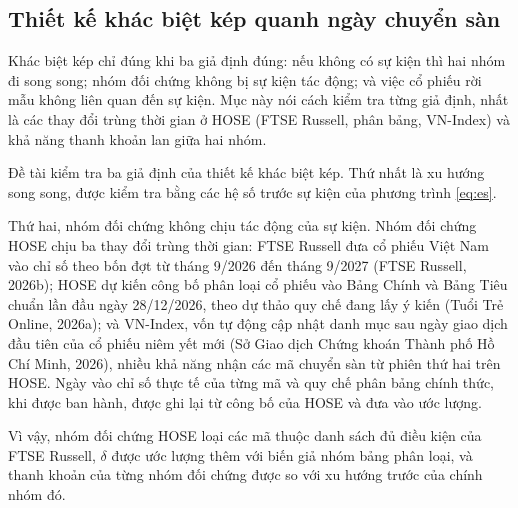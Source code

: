 \subsection{Thiết kế khác biệt kép quanh ngày chuyển sàn}\label{sec:did}

\begin{tomtat}
Khác biệt kép chỉ đúng khi ba giả định đúng: nếu không có sự kiện thì hai nhóm đi song song; nhóm đối chứng không bị sự kiện tác động; và việc cổ phiếu rời mẫu không liên quan đến sự kiện. Mục này nói cách kiểm tra từng giả định, nhất là các thay đổi trùng thời gian ở HOSE (FTSE Russell, phân bảng, VN-Index) và khả năng thanh khoản lan giữa hai nhóm.
\end{tomtat}

Đề tài kiểm tra ba giả định của thiết kế khác biệt kép. Thứ nhất là xu hướng song song, được kiểm tra bằng các hệ số trước sự kiện của phương trình \eqref{eq:es}.

Thứ hai, nhóm đối chứng không chịu tác động của sự kiện. Nhóm đối chứng HOSE chịu ba thay đổi trùng thời gian: FTSE Russell đưa cổ phiếu Việt Nam vào chỉ số theo bốn đợt từ tháng 9/2026 đến tháng 9/2027 (FTSE Russell, 2026b); HOSE dự kiến công bố phân loại cổ phiếu vào Bảng Chính và Bảng Tiêu chuẩn lần đầu ngày 28/12/2026, theo dự thảo quy chế đang lấy ý kiến (Tuổi Trẻ Online, 2026a); và VN-Index, vốn tự động cập nhật danh mục sau ngày giao dịch đầu tiên của cổ phiếu niêm yết mới (Sở Giao dịch Chứng khoán Thành phố Hồ Chí Minh, 2026), nhiều khả năng nhận các mã chuyển sàn từ phiên thứ hai trên HOSE. Ngày vào chỉ số thực tế của từng mã và quy chế phân bảng chính thức, khi được ban hành, được ghi lại từ công bố của HOSE và đưa vào ước lượng.

Vì vậy, nhóm đối chứng HOSE loại các mã thuộc danh sách đủ điều kiện của FTSE Russell, $\delta$ được ước lượng thêm với biến giả nhóm bảng phân loại, và thanh khoản của từng nhóm đối chứng được so với xu hướng trước của chính nhóm đó.

